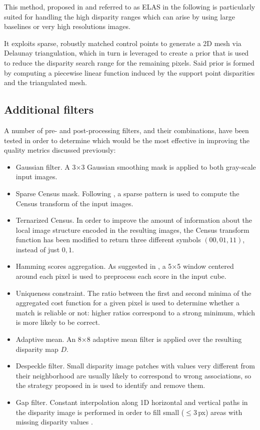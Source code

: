 This method, proposed in \cite{Geiger2011} and referred to as ELAS in the following is particularly suited for handling the high disparity ranges which can arise by using large baselines or very high resolutions images.

It exploits sparse, robustly matched control points to generate a 2D mesh via Delaunay triangulation, which in turn is leveraged to create a prior that is used to reduce the disparity search range for the remaining pixels. Said prior is formed by computing a piecewise linear function induced by the support point disparities and the triangulated mesh.

\subsection{Additional filters}\label{ch:chapter03_03_03}

A number of pre- and post-processing filters, and their combinations, have been tested in order to determine which would be the most effective in improving the quality metrics discussed previously:

\begin{itemize}
\item Gaussian filter. A 3$\times$3 Gaussian smoothing mask is applied to both gray-scale input images.
\item Sparse Census mask. Following \cite{Pantilie2012}, a sparse pattern is used to compute the Census transform of the input images.
\item Ternarized Census. In order to improve the amount of information about the local image structure encoded in the resulting images, the Census transform function has been modified to return three different symbols $(00, 01, 11)$, instead of just $0, 1$.
\item Hamming scores aggregation. As suggested in \cite{Pantilie2012}, a 5$\times$5 window centered around each pixel is used to preprocess each score in the input cube.
\item Uniqueness constraint. The ratio between the first and second minima of the aggregated cost function for a given pixel is used to determine whether a match is reliable or not: higher ratios correspond to a strong minimum, which is more likely to be correct.
\item Adaptive mean. An 8$\times$8 adaptive mean filter \cite{Geiger2011} is applied over the resulting disparity map $D$.
\item Despeckle filter. Small disparity image patches with values very different from their neighborhood are usually likely to correspond to wrong associations, so the strategy proposed in \cite{Hirschmuller2008} is used to identify and remove them.
\item Gap filter. Constant interpolation along 1D horizontal and vertical paths in the disparity image is performed in order to fill small ($\leq 3$\,px) areas with missing disparity values \cite{Geiger2011}.
\end{itemize}

